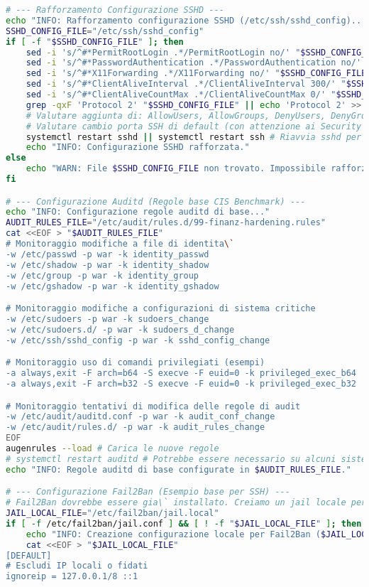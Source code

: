 \begin{lstlisting}[language=Bash, style=bash, caption={Script di Hardening del Sistema Operativo (hardening\_script.sh)}, label={lst:hardening_script_cap2}]
# --- Rafforzamento Configurazione SSHD ---
echo "INFO: Rafforzamento configurazione SSHD (/etc/ssh/sshd_config)..."
SSHD_CONFIG_FILE="/etc/ssh/sshd_config"
if [ -f "$SSHD_CONFIG_FILE" ]; then
    sed -i 's/^#*PermitRootLogin .*/PermitRootLogin no/' "$SSHD_CONFIG_FILE"
    sed -i 's/^#*PasswordAuthentication .*/PasswordAuthentication no/' "$SSHD_CONFIG_FILE" # Richiede key-based auth
    sed -i 's/^#*X11Forwarding .*/X11Forwarding no/' "$SSHD_CONFIG_FILE"
    sed -i 's/^#*ClientAliveInterval .*/ClientAliveInterval 300/' "$SSHD_CONFIG_FILE"
    sed -i 's/^#*ClientAliveCountMax .*/ClientAliveCountMax 0/' "$SSHD_CONFIG_FILE"
    grep -qxF 'Protocol 2' "$SSHD_CONFIG_FILE" || echo 'Protocol 2' >> "$SSHD_CONFIG_FILE"
    # Valutare aggiunta di: AllowUsers, AllowGroups, DenyUsers, DenyGroups
    # Valutare cambio porta SSH di default (con attenzione ai Security Groups)
    systemctl restart sshd || systemctl restart ssh # Riavvia sshd per applicare le modifiche
    echo "INFO: Configurazione SSHD rafforzata."
else
    echo "WARN: File $SSHD_CONFIG_FILE non trovato. Impossibile rafforzare SSHD."
fi

# --- Configurazione Auditd (Regole base CIS Benchmark) ---
echo "INFO: Configurazione regole auditd di base..."
AUDIT_RULES_FILE="/etc/audit/rules.d/99-finanz-hardening.rules"
cat <<EOF > "$AUDIT_RULES_FILE"
# Monitoraggio modifiche a file di identita\`
-w /etc/passwd -p war -k identity_passwd
-w /etc/shadow -p war -k identity_shadow
-w /etc/group -p war -k identity_group
-w /etc/gshadow -p war -k identity_gshadow

# Monitoraggio modifiche a configurazioni di sistema critiche
-w /etc/sudoers -p war -k sudoers_change
-w /etc/sudoers.d/ -p war -k sudoers_d_change
-w /etc/ssh/sshd_config -p war -k sshd_config_change

# Monitoraggio uso di comandi privilegiati (esempi)
-a always,exit -F arch=b64 -S execve -F euid=0 -k privileged_exec_b64
-a always,exit -F arch=b32 -S execve -F euid=0 -k privileged_exec_b32

# Monitoraggio tentativi di modifica delle regole di audit
-w /etc/audit/auditd.conf -p war -k audit_conf_change
-w /etc/audit/rules.d/ -p war -k audit_rules_change
EOF
augenrules --load # Carica le nuove regole
# systemctl restart auditd # Potrebbe essere necessario su alcuni sistemi
echo "INFO: Regole auditd di base configurate in $AUDIT_RULES_FILE."

# --- Configurazione Fail2Ban (Esempio base per SSH) ---
# Fail2Ban dovrebbe essere gia\` installato. Creiamo un jail locale per SSH.
JAIL_LOCAL_FILE="/etc/fail2ban/jail.local"
if [ -f /etc/fail2ban/jail.conf ] && [ ! -f "$JAIL_LOCAL_FILE" ]; then
    echo "INFO: Creazione configurazione locale per Fail2Ban ($JAIL_LOCAL_FILE)..."
    cat <<EOF > "$JAIL_LOCAL_FILE"
[DEFAULT]
# Escludi IP locali o fidati
ignoreip = 127.0.0.1/8 ::1


\end{lstlisting}

